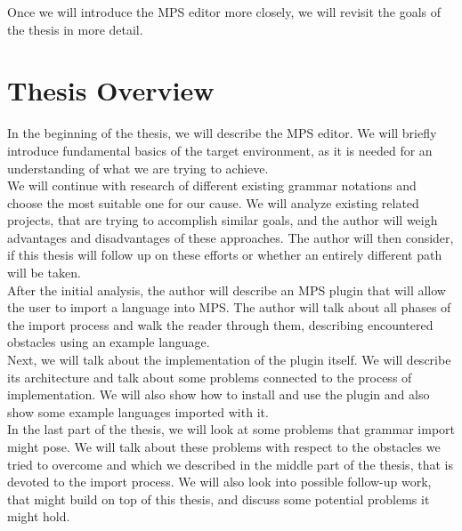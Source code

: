Once we will introduce the MPS editor more closely, we will revisit the goals of the thesis in more detail.

\section{Thesis Overview}

In the beginning of the thesis, we will describe the MPS editor.
We will briefly introduce fundamental basics of the target environment, as it is needed for an understanding of what we are trying to achieve.
\\

We will continue with research of different existing grammar notations and choose the most suitable one for our cause.
We will analyze existing related projects, that are trying to accomplish similar goals, and the author will weigh advantages and disadvantages of these approaches.
The author will then consider, if this thesis will follow up on these efforts or whether an entirely different path will be taken.
\\

After the initial analysis, the author will describe an MPS plugin that will allow the user to import a language into MPS.
The author will talk about all phases of the import process and walk the reader through them, describing encountered obstacles using an example language.
\\

Next, we will talk about the implementation of the plugin itself.
We will describe its architecture and talk about some problems connected to the process of implementation.
We will also show how to install and use the plugin and also show some example languages imported with it.
\\

In the last part of the thesis, we will look at some problems that grammar import might pose.
We will talk about these problems with respect to the obstacles we tried to overcome and which we described in the middle part of the thesis, that is devoted to the import process.
We will also look into possible follow-up work, that might build on top of this thesis, and discuss some potential problems it might hold.
